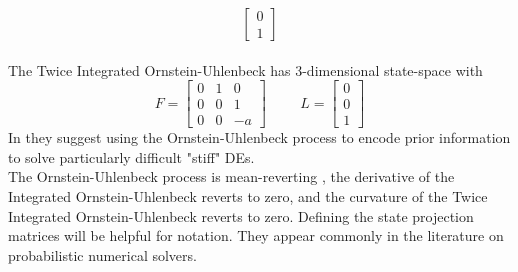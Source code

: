 {$$\begin{bmatrix}
        0 \\ 1
    \end{bmatrix}$$
    \\ The Twice Integrated Ornstein-Uhlenbeck has 3-dimensional state-space with $$F=\begin{bmatrix}
        0 & 1 & 0 \\ 0 & 0 & 1 \\ 0 & 0 & -a
    \end{bmatrix} \hspace{1cm} L=\begin{bmatrix}
         0 \\ 0 \\  1
    \end{bmatrix}$$
    In \cite{exponential_probabilistic} they suggest using the Ornstein-Uhlenbeck process to encode prior information to solve particularly difficult "stiff" DEs.\\
    The Ornstein-Uhlenbeck process is mean-reverting \cite{probnum}, the derivative of the Integrated Ornstein-Uhlenbeck reverts to zero, and the curvature of the Twice Integrated Ornstein-Uhlenbeck reverts to zero.
}
Defining the state projection matrices will be helpful for notation. They appear commonly in the literature on probabilistic numerical solvers.

